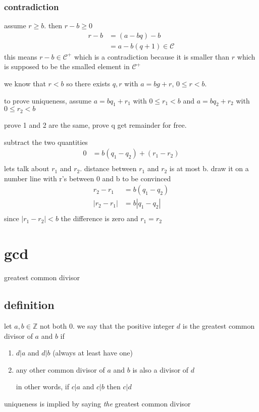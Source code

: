 \documentclass[letterpaper]{article}
\begin{document}
\subsubsection*{contradiction}
assume $r\ge b$. then $r-b\ge0$
\begin{align*}
  r-b&=(a-bq)-b\\
  &=a-b(q+1)\in\mathcal{C}
\end{align*}
this means $r-b\in\mathcal{C}^+$ which is a contradiction because it is smaller than $r$ which is supposed to be the smalled element in $\mathcal{C}^+$

we know that $r<b$ so there exists $q,r$ with $a=bg+r$, $0\le r<b$.

to prove uniqueness, assume $a=bq_1+r_1$ with $0\le r_1<b$ and $a=bq_2+r_2$ with $0\le r_2<b$

prove 1 and 2 are the same, prove q get remainder for free.

subtract the two quantities
\begin{align*}
  0&=b(q_1-q_2)+(r_1-r_2)\\
\end{align*}
lets talk about $r_1$ and $r_2$. distance between $r_1$ and $r_2$ is at most b. draw it on a number line with r's between 0 and b to be convinced
\begin{align*}
  r_2-r_1&=b(q_1-q_2)\\
  \left\lvert r_2-r_1\right\rvert&=b\left\lvert q_1-q_2\right\rvert\\
\end{align*}
since $\left\lvert r_1-r_2\right\rvert<b$ the difference is zero and $r_1=r_2$

\section*{gcd}
greatest common divisor
\subsection*{definition}
let $a,b\in\mathbb{Z}$ not both 0. we say that the positive integer $d$ is the greatest common divisor of $a$ and $b$ if
\begin{enumerate}
\item
$d\vert a$ and $d\vert b$ (always at least have one)
\item
any other common divisor of $a$ and $b$ is also a divisor of $d$

in other words, if $c\vert a$ and $c\vert b$ then $c\vert d$
\end{enumerate}
uniqueness is implied by saying \emph{the} greatest common divisor
\end{document}
